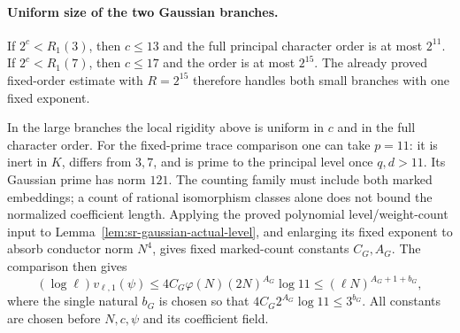 \paragraph{Uniform size of the two Gaussian branches.}
If \(2^c<R_1(3)\), then \(c\le13\) and the full principal
character order is at most \(2^{11}\).
If \(2^c<R_1(7)\), then \(c\le17\) and the order is at most
\(2^{15}\). The already proved fixed-order estimate with
\(R=2^{15}\) therefore handles both small branches with one
fixed exponent.

In the large branches the local rigidity above is uniform
in \(c\) and in the full character order.
For the fixed-prime trace comparison one can take \(p=11\):
it is inert in \(K\), differs from \(3,7\), and is prime to
the principal level once \(q,d>11\).
Its Gaussian prime has norm \(121\).
The counting family must include both marked embeddings;
a count of rational isomorphism classes alone does not
bound the normalized coefficient length.
Applying the proved polynomial level/weight-count input to
Lemma~\ref{lem:sr-gaussian-actual-level}, and enlarging its
fixed exponent to absorb conductor norm \(N^4\), gives fixed
marked-count constants \(C_G,A_G\). The comparison then gives
\[
 (\log\ell)v_{\ell,1}(\psi)
 \le4C_G\varphi(N)(2N)^{A_G}\log11
 \le(\ell N)^{A_G+1+b_G},
\]
where the single natural \(b_G\) is chosen so that
\(4C_G2^{A_G}\log11\le3^{b_G}\).
All constants are chosen before \(N,c,\psi\) and its
coefficient field.

